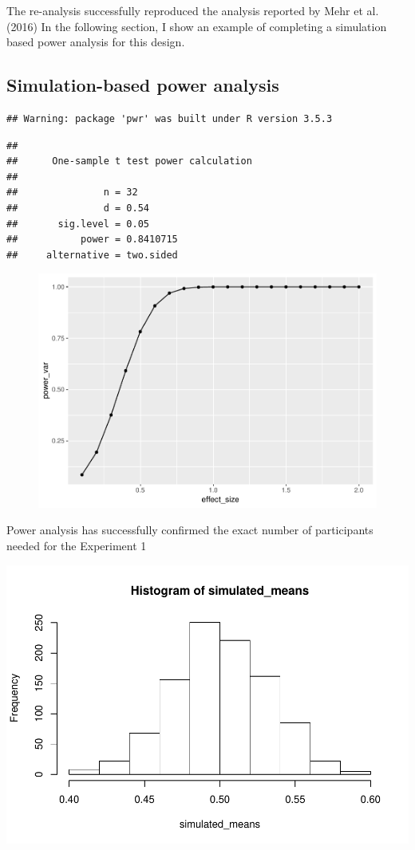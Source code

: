 \documentclass[man]{apa6}
\begin{document}
The re-analysis successfully reproduced the analysis reported by Mehr et
al. (2016) In the following section, I show an example of completing a
simulation based power analysis for this design.

\subsection{Simulation-based power
analysis}\label{simulation-based-power-analysis}

\begin{verbatim}
## Warning: package 'pwr' was built under R version 3.5.3
\end{verbatim}

\begin{verbatim}
## 
##      One-sample t test power calculation 
## 
##               n = 32
##               d = 0.54
##       sig.level = 0.05
##           power = 0.8410715
##     alternative = two.sided
\end{verbatim}

\begin{figure}
\centering
\includegraphics{Midterm_files/figure-latex/unnamed-chunk-9-1.pdf}
\caption{}
\end{figure}

Power analysis has successfully confirmed the exact number of
participants needed for the Experiment 1

\includegraphics{Midterm_files/figure-latex/unnamed-chunk-10-1.pdf}
\newpage
\end{document}
